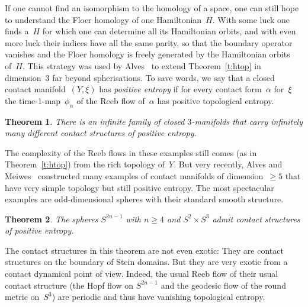 \documentclass[12pt,twoside]{amsart}
\theoremstyle{plain}
\newtheorem{theorem}{Theorem}[section]
\numberwithin{figure}{section}
\numberwithin{equation}{section}
\def\ga{\alpha}
\begin{document}
If one cannot find an isomorphism to the homology of a space, 
one can still hope to understand the Floer homology of one Hamiltonian~$H$. 
With some luck one finds a~$H$ for which one can determine all its Hamiltonian orbits, 
and with even more luck their indices have all the same parity, so that the boundary operator
vanishes and the Floer homology is freely generated by the Hamiltonian orbits of~$H$.
This strategy was used by Alves~\cite{Alv16a, Alv16b} to extend Theorem~\ref{t:htop} in dimension~3 
far beyond spherisations. 
To save words, we say that a closed contact manifold~$(Y,\xi)$ has {\it positive entropy}\/ 
if for every contact form~$\ga$ for~$\xi$ the time-1-map~$\phi_\ga$ of the Reeb flow
of~$\ga$ has positive topological entropy.

\begin{theorem}
There is an infinite family of closed $3$-manifolds 
that carry infinitely many different contact structures of positive entropy.
\end{theorem}

The complexity of the Reeb flows in these examples still comes (as in Theorem~\ref{t:htop})
from the rich topology of~$Y$. 
But very recently, Alves and Meiwes~\cite{AlMe17}
constructed many examples of contact manifolds of dimension~$\geqslant 5$ 
that have very simple topology but still positive entropy.
The most spectacular examples are odd-dimensional spheres with their standard smooth structure.

\begin{theorem} \label{t:AlMe}
The spheres $S^{2n-1}$ with $n \geqslant 4$ and $S^2 \times S^3$ 
admit contact structures of positive entropy.  
\end{theorem}

The contact structures in this theorem are not even exotic: 
They are contact structures on the boundary of Stein domains.
But they are very exotic from a contact dynamical point of view.
Indeed, the usual Reeb flow of their usual contact structure 
(the Hopf flow on $S^{2n-1}$ and the geodesic flow of the round metric on~$S^3$)
are periodic and thus have vanishing topological entropy.
\end{document}
